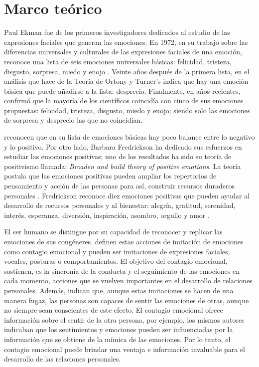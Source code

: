 \documentclass{textolivre}
\begin{document}
\section{Marco teórico}\label{sec-marco}
Paul Ekman fue de los primeros investigadores dedicados al estudio de las expresiones faciales que generan las emociones. En 1972, en su trabajo sobre las diferencias universales y culturales de las expresiones faciales de una emoción, reconoce una lista de seis emociones universales básicas: felicidad, tristeza, disgusto, sorpresa, miedo y enojo \cite{ekman1972}. Veinte años después de la primera lista, \textcite{ekman1992} en el análisis que hace de la Teoría de Ortony y Turner’s indica que hay una emoción básica que puede añadirse a la lista: desprecio. Finalmente, en años recientes, \textcite{ekman2016} confirmó que la mayoría de los científicos coincidía con cinco de sus emociones propuestas: felicidad, tristeza, disgusto, miedo y enojo; siendo solo las emociones de sorpresa y desprecio las que no coincidían. 

\textcite{ekman2011} reconocen que en su lista de emociones básicas hay poco balance entre lo negativo y lo positivo. Por otro lado, Barbara Fredrickson ha dedicado sus esfuerzos en estudiar las emociones positivas; uno de los resultados ha sido su teoría de positivismo llamada: \textit{Broaden and build theory of positive emotions}. La teoría postula que las emociones positivas pueden ampliar los repertorios de pensamiento y acción de las personas para así, construir recursos duraderos personales \cite{fredrickson2004}. Fredrickson reconoce diez emociones positivas que pueden ayudar al desarrollo de recursos personales y al bienestar: alegría, gratitud, serenidad, interés, esperanza, diversión, inspiración, asombro, orgullo y amor \cite{fredrickson2013}. 

El ser humano se distingue por su capacidad de reconocer y replicar las emociones de sus congéneres. \textcite{hatfield1993} definen estas acciones de imitación de emociones como contagio emocional y pueden ser imitaciones de expresiones faciales, vocales, posturas o comportamientos. El objetivo del contagio emocional, sostienen, es la sincronía de la conducta y el seguimiento de las emociones en cada momento, acciones que se vuelven importantes en el desarrollo de relaciones personales. Además, indican que, aunque estas imitaciones se hacen de una manera fugaz, las personas son capaces de sentir las emociones de otras, aunque no siempre sean conscientes de este efecto. El contagio emocional ofrece información sobre el sentir de la otra persona, por ejemplo, los mismos autores indicaban que los sentimientos y emociones pueden ser influenciadas por la información que se obtiene de la mímica de las emociones.  Por lo tanto, el contagio emocional puede brindar una ventaja e información invaluable para el desarrollo de las relaciones personales.  
\end{document}
